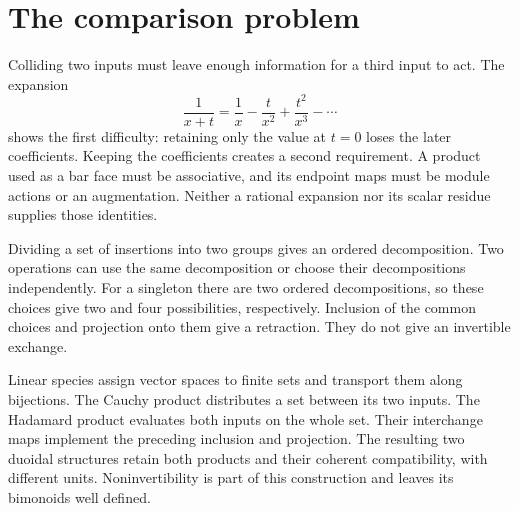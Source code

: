 \documentclass[11pt,reqno]{amsart}
\theoremstyle{definition}
\theoremstyle{remark}
\begin{document}
\begin{abstract}
Independently, finite factorization of positive root weights makes the
Euler supercharacter of the enveloping-algebra bar equal to the signed
root product.  Its Igusa realization includes the Weyl shift and gives
\(D_5(2Z)=64^{-1}\Delta_5(2Z)\).  The positive-Witt and ordinary
\(\mathfrak{sl}_2\) examples keep their Lie and bar gradings distinct.
A balanced Virasoro vacuum admits a strict dg vertex comparison over
every commutative rational coefficient ring.  Over a characteristic-zero
field it induces a direct-sum Lie--chiral Chevalley comparison in all
word lengths, with the geometric tensor and its coaugmentation specified.
The supported action, the passage between geometric and root-graded
bars, and analytic field operations on completed states are
formulated with their required maps and hypotheses.
\end{abstract}

\maketitle

\section{The comparison problem}

Colliding two inputs must leave enough information for a third input
to act.  The expansion
\[
 \frac{1}{x+t}=\frac{1}{x}-\frac{t}{x^2}
                  +\frac{t^2}{x^3}-\cdots
\]
shows the first difficulty: retaining only the value at \(t=0\)
loses the later coefficients.  Keeping the coefficients creates a
second requirement.  A product used as a bar face must be associative,
and its endpoint maps must be module actions or an augmentation.
Neither a rational expansion nor its scalar residue supplies those
identities.

Dividing a set of insertions into two groups gives an ordered
decomposition.  Two operations can use the same decomposition or choose
their decompositions independently.  For a singleton there are two
ordered decompositions, so these choices give two and four possibilities,
respectively.  Inclusion of the common choices and projection onto them
give a retraction.  They do not give an invertible exchange.

Linear species assign vector spaces to finite sets and transport them
along bijections.  The Cauchy product distributes a set between its two
inputs.  The Hadamard product evaluates both inputs on the whole set.
Their interchange maps implement the preceding inclusion and projection.
The resulting two duoidal structures retain both products and their
coherent compatibility, with different units.  Noninvertibility is part
of this construction and leaves its bimonoids well defined.
\end{document}
